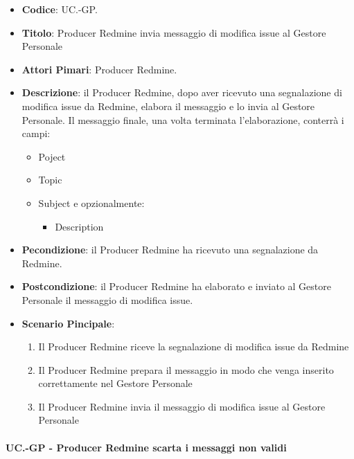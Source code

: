 		\begin{itemize}
			\item \textbf{Codice}: UC\theuccount.\thesubuccount-GP.
			\item \textbf{Titolo}: Producer Redmine invia messaggio di modifica issue al Gestore Personale
			\item \textbf{Attori Pimari}: Producer Redmine.
			\item \textbf{Descrizione}: il Producer Redmine, dopo aver
			ricevuto una segnalazione di modifica issue da Redmine, elabora il messaggio e lo invia al Gestore Personale.
			Il messaggio finale, una volta terminata l'elaborazione, conterrà i campi:
			\begin{itemize}
				\item Poject
				\item Topic
				\item Subject e opzionalmente:
				\begin{itemize}
					\item Description
				\end{itemize}
			\end{itemize}
			\item \textbf{Pecondizione}: il Producer Redmine ha ricevuto una segnalazione da Redmine.
			\item \textbf{Postcondizione}: il Producer Redmine ha elaborato e inviato al Gestore Personale il messaggio di modifica issue.
			\item \textbf{Scenario Pincipale}: 
			\begin{enumerate}
				\item Il Producer Redmine riceve la segnalazione di modifica issue da Redmine
				\item Il Producer Redmine prepara il messaggio in modo che venga inserito correttamente nel Gestore Personale
				\item Il Producer Redmine invia il messaggio di
				modifica issue al Gestore Personale
			\end{enumerate}
			
		\end{itemize}
	
	\paragraph{UC\theuccount.\thesubuccount-GP - Producer Redmine scarta i messaggi non validi}
	

